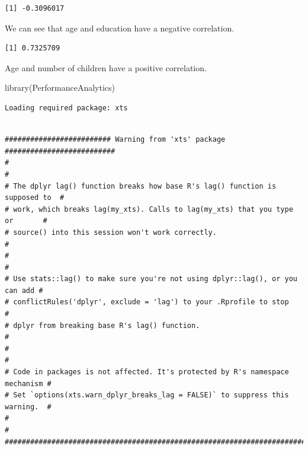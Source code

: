 \documentclass[
  letterpaper,
  DIV=11,
  numbers=noendperiod]{scrartcl}
\newenvironment{Shaded}{\begin{snugshade}}{\end{snugshade}}
\newcommand{\FunctionTok}[1]{\textcolor[rgb]{0.28,0.35,0.67}{#1}}
\newcommand{\NormalTok}[1]{\textcolor[rgb]{0.00,0.23,0.31}{#1}}
\newcommand{\SpecialCharTok}[1]{\textcolor[rgb]{0.37,0.37,0.37}{#1}}
\begin{document}
\begin{Shaded}
\end{Shaded}

\begin{verbatim}
[1] -0.3096017
\end{verbatim}

We can see that age and education have a negative correlation.

\begin{Shaded}
\end{Shaded}

\begin{verbatim}
[1] 0.7325709
\end{verbatim}

Age and number of children have a positive correlation.

\begin{Shaded}
\begin{Highlighting}[]
\FunctionTok{library}\NormalTok{(PerformanceAnalytics)}
\end{Highlighting}
\end{Shaded}

\begin{verbatim}
Loading required package: xts
\end{verbatim}

\begin{verbatim}

######################### Warning from 'xts' package ##########################
#                                                                             #
# The dplyr lag() function breaks how base R's lag() function is supposed to  #
# work, which breaks lag(my_xts). Calls to lag(my_xts) that you type or       #
# source() into this session won't work correctly.                            #
#                                                                             #
# Use stats::lag() to make sure you're not using dplyr::lag(), or you can add #
# conflictRules('dplyr', exclude = 'lag') to your .Rprofile to stop           #
# dplyr from breaking base R's lag() function.                                #
#                                                                             #
# Code in packages is not affected. It's protected by R's namespace mechanism #
# Set `options(xts.warn_dplyr_breaks_lag = FALSE)` to suppress this warning.  #
#                                                                             #
###############################################################################
\end{verbatim}
\end{document}
